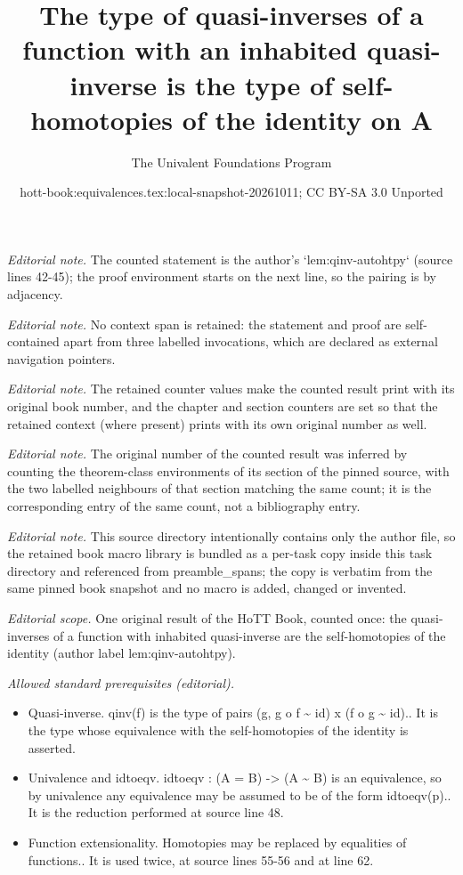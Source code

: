 \documentclass[10pt,a4paper]{article}
\title{The type of quasi-inverses of a function with an inhabited quasi-inverse is the type of self-homotopies of the identity on A}
\author{The Univalent Foundations Program}
\date{hott-book:equivalences.tex:local-snapshot-20261011; CC BY-SA 3.0 Unported}
\newcounter{chapter}
\theoremstyle{definition}
\theoremstyle{remark}
\numberwithin{equation}{section}
\begin{document}
\maketitle
\setcounter{chapter}{4}
\setcounter{section}{1}
\setcounter{thm}{0}
\noindent\textit{Editorial note.} The counted statement is the author's `lem:qinv-autohtpy` (source lines 42-45); the proof environment starts on the next line, so the pairing is by adjacency.\par\medskip
\noindent\textit{Editorial note.} No context span is retained: the statement and proof are self-contained apart from three labelled invocations, which are declared as external navigation pointers.\par\medskip
\noindent\textit{Editorial note.} The retained counter values make the counted result print with its original book number, and the chapter and section counters are set so that the retained context (where present) prints with its own original number as well.\par\medskip
\noindent\textit{Editorial note.} The original number of the counted result was inferred by counting the theorem-class environments of its section of the pinned source, with the two labelled neighbours of that section matching the same count; it is the corresponding entry of the same count, not a bibliography entry.\par\medskip
\noindent\textit{Editorial note.} This source directory intentionally contains only the author file, so the retained book macro library is bundled as a per-task copy inside this task directory and referenced from preamble\_spans; the copy is verbatim from the same pinned book snapshot and no macro is added, changed or invented.\par\medskip
\noindent\textit{Editorial scope.} One original result of the HoTT Book, counted once: the quasi-inverses of a function with inhabited quasi-inverse are the self-homotopies of the identity (author label lem:qinv-autohtpy).\par\medskip
\noindent\textit{Allowed standard prerequisites (editorial).}\begin{itemize}
\item Quasi-inverse. qinv(f) is the type of pairs (g, g o f \textasciitilde{} id) x (f o g \textasciitilde{} id).. It is the type whose equivalence with the self-homotopies of the identity is asserted.
\item Univalence and idtoeqv. idtoeqv : (A = B) -> (A \textasciitilde{} B) is an equivalence, so by univalence any equivalence may be assumed to be of the form idtoeqv(p).. It is the reduction performed at source line 48.
\item Function extensionality. Homotopies may be replaced by equalities of functions.. It is used twice, at source lines 55-56 and at line 62.
\end{itemize}\medskip
\end{document}
